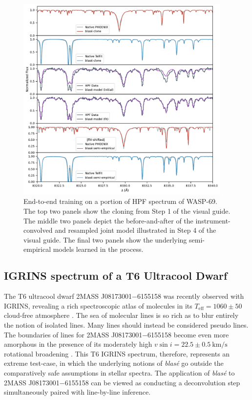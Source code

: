 \documentclass[twocolumn]{aastex631}
\begin{document}
\begin{figure}[hbt!]
    \centering
    \includegraphics[width=0.95\textwidth]{WASP_69_multi.pdf}
    \caption{End-to-end training on a portion of HPF spectrum of WASP-69. The top two panels show the cloning from Step 1 of the visual guide.  The middle two panels depict the before-and-after of the instrument-convolved and resampled joint model illustrated in Step 4 of the visual guide.  The final two panels show the underlying semi-empirical models learned in the process.}
    \label{fig_multi_panel_WASP69}
\end{figure}


\subsection{IGRINS spectrum of a T6 Ultracool Dwarf}

The T6 ultracool dwarf 2MASS J08173001$-$6155158 was recently observed with IGRINS, revealing a rich spectroscopic atlas of molecules in its $T_\mathrm{eff} = 1060 \pm 50$ cloud-free atmosphere \citep{2022MNRAS.tmp.1421T}.  The sea of molecular lines is so rich as to blur entirely the notion of isolated lines.  Many lines should instead be considered pseudo lines.  The boundaries of lines for 2MASS J08173001$-$6155158 become even more amorphous in the presence of its moderately high $v\sin{i} = 22.5\pm 0.5 ~ \text{km/s}$ rotational broadening \citep{2022MNRAS.tmp.1421T}.  This T6 IGRINS spectrum, therefore, represents an extreme test-case, in which the underlying notions of \emph{blas\'e} go outside the comparatively safe assumptions in stellar spectra.  The application of  \emph{blas\'e} to 2MASS J08173001$-$6155158 can be viewed as conducting a deconvolution step simultaneously paired with line-by-line inference.
\end{document}
